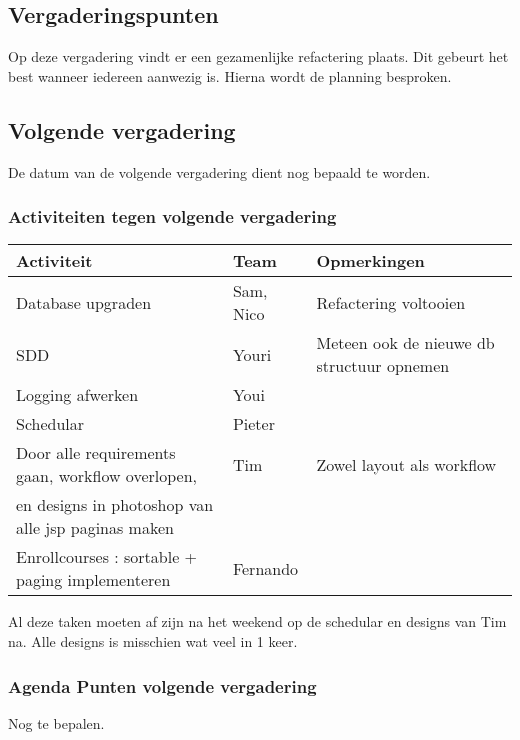 \subsection{Vergaderingspunten}
Op deze vergadering vindt er een gezamenlijke refactering plaats. Dit gebeurt het best wanneer iedereen aanwezig is. Hierna wordt de planning besproken.

\subsection{Volgende vergadering}
De datum van de volgende vergadering dient nog bepaald te worden.
\subsubsection{Activiteiten tegen volgende vergadering} \label{sec:TODOActiviteiten}
\begin{table} [H]
	\centering
	\begin{tabular} {l|l|l}
		\textbf{Activiteit} & \textbf{Team} & \textbf{Opmerkingen} \\
		\hline
		Database upgraden & Sam, Nico & Refactering voltooien \\
		SDD & Youri & Meteen ook de nieuwe db structuur opnemen \\
		Logging afwerken & Youi & \\
		Schedular & Pieter & \\
		Door alle requirements gaan, workflow overlopen, & Tim & Zowel layout als workflow \\
		en designs in photoshop van alle jsp paginas maken & & \\
		Enrollcourses : sortable + paging implementeren & Fernando & \\
	\end{tabular}
\end{table}
Al deze taken moeten af zijn na het weekend op de schedular en designs van Tim na. Alle designs is misschien wat veel in 1 keer.
\subsubsection{Agenda Punten volgende vergadering}
Nog te bepalen.